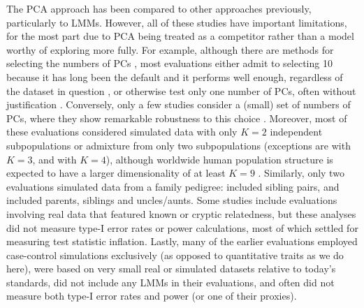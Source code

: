 \documentclass[11pt]{article}
\begin{document}
The PCA approach has been compared to other approaches previously, particularly to LMMs.
However, all of these studies have important limitations, for the most part due to PCA being treated as a competitor rather than a model worthy of exploring more fully.
For example, although there are methods for selecting the numbers of PCs \citep{patterson_population_2006}, most evaluations either admit to selecting 10 because it has long been the default and it performs well enough, regardless of the dataset in question \citep{epstein_simple_2007, li_improved_2008, astle_population_2009, li_correcting_2010, wu_comparison_2011}, or otherwise test only one number of PCs, often without justification \citep{zhang_semiparametric_2003, kimmel_randomization_2007, zhao_arabidopsis_2007, zhang_comparison_2008, price_new_2010, bouaziz_accounting_2011, hoffman_correcting_2013, tucker_improving_2014, yang_advantages_2014, song_testing_2015, sul_population_2018}.
Conversely, only a few studies consider a (small) set of numbers of PCs, where they show remarkable robustness to this choice \citep{price_principal_2006, kang_variance_2010, wojcik_genetic_2019}.
Moreover, most of these evaluations considered simulated data with only $K = 2$ independent subpopulations or admixture from only two subpopulations (exceptions are \citet{astle_population_2009} with $K=3$, and \citet{wu_comparison_2011} with $K = 4$), although worldwide human population structure is expected to have a larger dimensionality of at least $K = 9$ \citep{wojcik_genetic_2019}.
Similarly, only two evaluations simulated data from a family pedigree: \citet{price_new_2010} included sibling pairs, and \citet{thornton_roadtrips:_2010} included parents, siblings and uncles/aunts.
Some studies include evaluations involving real data that featured known or cryptic relatedness, but these analyses did not measure type-I error rates or power calculations, most of which settled for measuring test statistic inflation.
Lastly, many of the earlier evaluations employed case-control simulations exclusively (as opposed to quantitative traits as we do here), were based on very small real or simulated datasets relative to today's standards, did not include any LMMs in their evaluations, and often did not measure both type-I error rates and power (or one of their proxies).
\end{document}
